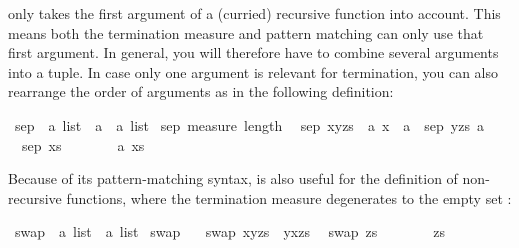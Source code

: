 \begin{isabellebody}
\begin{isamarkuptext}
\begin{warn}
   only takes the first argument of a (curried)
  recursive function into account. This means both the termination measure
  and pattern matching can only use that first argument. In general, you will
  therefore have to combine several arguments into a tuple. In case only one
  argument is relevant for termination, you can also rearrange the order of
  arguments as in the following definition:
\end{warn}%
\end{isamarkuptext}%
\isamarkuptrue%
\ sep{}\ {\isacharcolon}{\isacharcolon}\ {\isachardoublequote}{\isacharprime}a\ list\ {\isasymRightarrow}\ {\isacharprime}a\ {\isasymRightarrow}\ {\isacharprime}a\ list{\isachardoublequote}\isanewline
\isamarkupfalse%
\ sep{}\ {\isachardoublequote}measure\ length{\isachardoublequote}\isanewline
\ \ {\isachardoublequote}sep{}\ {\isacharparenleft}x{\isacharhash}y{\isacharhash}zs{\isacharparenright}\ {\isacharequal}\ {\isacharparenleft}{\isasymlambda}a{\isachardot}\ x\ {\isacharhash}\ a\ {\isacharhash}\ sep{}\ {\isacharparenleft}y{\isacharhash}zs{\isacharparenright}\ a{\isacharparenright}{\isachardoublequote}\isanewline
\ \ {\isachardoublequote}sep{}\ xs\ \ \ \ \ \ \ {\isacharequal}\ {\isacharparenleft}{\isasymlambda}a{\isachardot}\ xs{\isacharparenright}{\isachardoublequote}\isamarkupfalse%
%
\begin{isamarkuptext}%
Because of its pattern-matching syntax,  is also useful
for the definition of non-recursive functions, where the termination measure
degenerates to the empty set \isa{{\isacharbraceleft}{\isacharbraceright}}:%
\end{isamarkuptext}%
\isamarkuptrue%
\ swap{}{}\ {\isacharcolon}{\isacharcolon}\ {\isachardoublequote}{\isacharprime}a\ list\ {\isasymRightarrow}\ {\isacharprime}a\ list{\isachardoublequote}\isanewline
\isamarkupfalse%
\ swap{}{}\ {\isachardoublequote}{\isacharbraceleft}{\isacharbraceright}{\isachardoublequote}\isanewline
\ \ {\isachardoublequote}swap{}{}\ {\isacharparenleft}x{\isacharhash}y{\isacharhash}zs{\isacharparenright}\ {\isacharequal}\ y{\isacharhash}x{\isacharhash}zs{\isachardoublequote}\isanewline
\ \ {\isachardoublequote}swap{}{}\ zs\ \ \ \ \ \ \ {\isacharequal}\ zs{\isachardoublequote}\isanewline
\isamarkupfalse%
\isamarkupfalse%
\end{isabellebody}%
